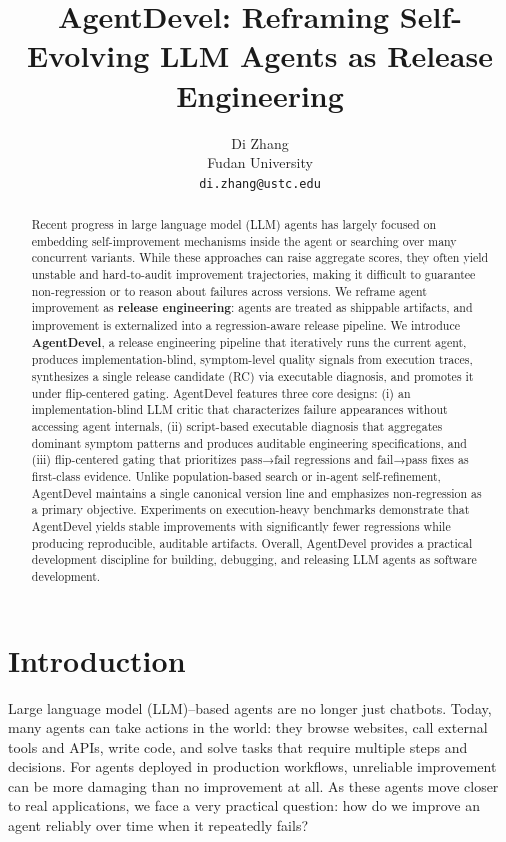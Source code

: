 \documentclass[11pt]{article}
\title{AgentDevel: Reframing Self-Evolving LLM Agents as Release Engineering}
\author{Di Zhang \\
  Fudan University \\
  \texttt{di.zhang@ustc.edu} \\}
\begin{document}
\maketitle
\begin{abstract}
Recent progress in large language model (LLM) agents has largely focused on embedding self-improvement mechanisms inside the agent or searching over many concurrent variants. While these approaches can raise aggregate scores, they often yield unstable and hard-to-audit improvement trajectories, making it difficult to guarantee non-regression or to reason about failures across versions. We reframe agent improvement as \textbf{release engineering}: agents are treated as shippable artifacts, and improvement is externalized into a regression-aware release pipeline.
We introduce \textbf{AgentDevel}, a release engineering pipeline that iteratively runs the current agent, produces implementation-blind, symptom-level quality signals from execution traces, synthesizes a single release candidate (RC) via executable diagnosis, and promotes it under flip-centered gating. AgentDevel features three core designs: (i) an implementation-blind LLM critic that characterizes failure appearances without accessing agent internals, (ii) script-based executable diagnosis that aggregates dominant symptom patterns and produces auditable engineering specifications, and (iii) flip-centered gating that prioritizes pass→fail regressions and fail→pass fixes as first-class evidence.
Unlike population-based search or in-agent self-refinement, AgentDevel maintains a single canonical version line and emphasizes non-regression as a primary objective. Experiments on execution-heavy benchmarks demonstrate that AgentDevel yields stable improvements with significantly fewer regressions while producing reproducible, auditable artifacts. Overall, AgentDevel provides a practical development discipline for building, debugging, and releasing LLM agents as software development.

\end{abstract}

\section{Introduction}

Large language model (LLM)–based agents are no longer just chatbots. Today, many agents can take actions in the world: they browse websites, call external tools and APIs, write code, and solve tasks that require multiple steps and decisions. For agents deployed in production workflows, unreliable improvement can be more damaging than no improvement at all. As these agents move closer to real applications, we face a very practical question: how do we improve an agent reliably over time when it repeatedly fails?
\end{document}
